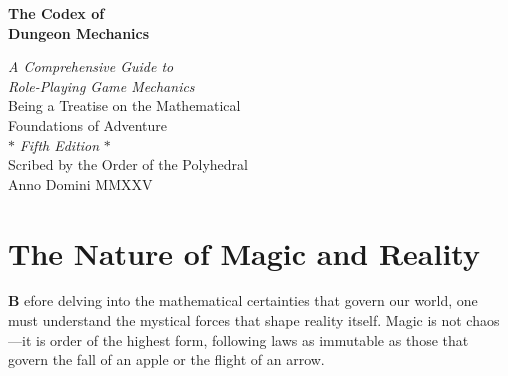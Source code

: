 \documentclass[11pt,letterpaper,openany]{book}
\newcommand{\firstletter}[1]{%
    \textcolor{bloodred}{\fontsize{48}{48}\selectfont\bfseries #1}%
}
\begin{document}
\clearpage
\begin{titlepage}
\begin{center}
\vspace*{2cm}

{\Huge\textbf{The Codex of}}\\[0.5cm]
{\Huge\textbf{Dungeon Mechanics}}\\[1cm]


\vspace{1cm}

{\Large\textit{A Comprehensive Guide to}}\\
{\Large\textit{Role-Playing Game Mechanics}}\\[2cm]

{\large Being a Treatise on the Mathematical}\\
{\large Foundations of Adventure}\\[1cm]

$\ast$ \quad \textit{Fifth Edition} \quad $\ast$\\[2cm]

{\large Scribed by the Order of the Polyhedral}\\
{\large Anno Domini MMXXV}

\end{center}
\end{titlepage}

\tableofcontents
\clearpage

\mainmatter
\chapter{The Nature of Magic and Reality}

\firstletter{B}efore delving into the mathematical certainties that govern our world, one must understand the mystical forces that shape reality itself. Magic is not chaos—it is order of the highest form, following laws as immutable as those that govern the fall of an apple or the flight of an arrow.
\end{document}
